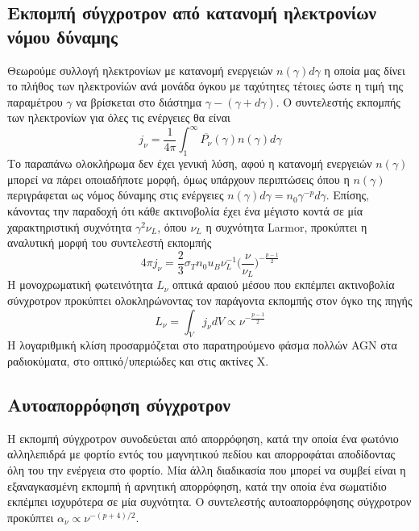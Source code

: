 \subsection*{Εκπομπή σύγχροτρον από κατανομή ηλεκτρονίων νόμου δύναμης}

Θεωρούμε συλλογή ηλεκτρονίων με κατανομή ενεργειών $n(\gamma)d\gamma$ η οποία μας δίνει το πλήθος των ηλεκτρονίών ανά μονάδα όγκου με ταχύτητες τέτοιες ώστε η τιμή της παραμέτρου $\gamma$ να βρίσκεται στο διάστημα $\gamma - (\gamma +d\gamma)$. Ο συντελεστής εκπομπής των ηλεκτρονίων για όλες τις ενέργειες θα είναι\cite{netzer_2013}
\begin{equation}
    j_\nu =\frac{1}{4\pi} \int_1^\infty \overline{P_\nu}(\gamma) n(\gamma)d\gamma 
\end{equation}
Το παραπάνω ολοκλήρωμα δεν έχει γενική λύση, αφού η κατανομή ενεργειών $n(\gamma)$ μπορεί να πάρει οποιαδήποτε μορφή, όμως υπάρχουν περιπτώσεις όπου η $n(\gamma)$ περιγράφεται ως νόμος δύναμης στις ενέργειες $n(\gamma )d\gamma = n_0 \gamma^{ − p} d\gamma $. Επίσης, κάνοντας την παραδοχή ότι κάθε ακτινοβολία έχει ένα μέγιστο κοντά σε μία χαρακτηριστική συχνότητα $\gamma^2 \nu_L$, όπου $\nu_L$ η συχνότητα \textlatin{Larmor}, προκύπτει η αναλυτική μορφή του συντελεστή εκπομπής\cite{netzer_2013}
\begin{equation}
    4\pi j_\nu =\frac{2}{3} \sigma_T n_0 u_B \nu_L^{-1} \Big( \frac{\nu}{\nu_L} \Big)^{-\frac{p-1}{2}}
\end{equation}
Η μονοχρωματική φωτεινότητα $L_\nu$ οπτικά αραιού μέσου που εκπέμπει ακτινοβολία σύνχροτρον προκύπτει ολοκληρώνοντας τον παράγοντα εκπομπής στον όγκο της πηγής\cite{netzer_2013}
\begin{equation}
    L_\nu =\int_V j_\nu dV  \propto \nu^{-\frac{p-1}{2}} \label{eq:LumiSynch}
\end{equation}
Η λογαριθμική κλίση προσαρμόζεται στο παρατηρούμενο φάσμα πολλών \textlatin{AGN} στα ραδιοκύματα, στο οπτικό/υπεριώδες και στις ακτίνες Χ. 

\subsection*{Αυτοαπορρόφηση σύγχροτρον}

Η εκπομπή σύγχροτρον συνοδεύεται από απορρόφηση, κατά την οποία ένα φωτόνιο αλληλεπιδρά με φορτίο εντός του μαγνητικού πεδίου και απορροφάται αποδίδοντας όλη του την ενέργεια στο φορτίο. Μία άλλη διαδικασία που μπορεί να συμβεί είναι η εξαναγκασμένη εκπομπή ή αρνητική απορρόφηση, κατά την οποία ένα σωματίδιο εκπέμπει ισχυρότερα σε μία συχνότητα\cite{1986rpa..book.....R}. Ο συντελεστής αυτοαπορρόφησης σύγχροτρον προκύπτει\cite{1986rpa..book.....R} $\alpha_\nu \propto \nu^{-(p+4)/2} $.

